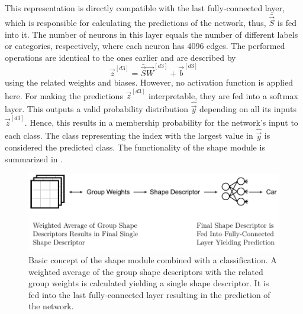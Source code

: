 This representation is directly compatible with the last fully-connected layer, which is responsible for calculating the predictions of the network, thus, $\bar{\vec{S}}$ is fed into it.
The number of neurons in this layer equals the number of different labels or categories, respectively, where each neuron has 4096 edges.
The performed operations are identical to the ones earlier and are described by
\begin{equation}
	\vec{z}^{[d3]} = \bar{\vec{S}} \vec{W}^{[d3]} + \vec{b}^{[d3]}
\end{equation}
using the related weights and biases.
However, no activation function is applied here.
For making the predictions $\vec{z}^{[d3]}$ interpretable, they are fed into a softmax layer.
This outputs a valid probability distribution $\hat{\vec{y}}$ depending on all its inputs $\vec{z}^{[d3]}$.
Hence, this results in a membership probability for the network's input to each class.
The class representing the index with the largest value in $\hat{\vec{y}}$ is considered the predicted class. The functionality of the shape module is summarized in .
\begin{figure}
	\centering
	\includegraphics[]{images/shape_module_final_shape.pdf}
	\caption[Basic concept of the shape module]{Basic concept of the shape module combined with a classification. A weighted average of the group shape descriptors with the related group weights is calculated yielding a single shape descriptor. It is fed into the last fully-connected layer resulting in the prediction of the network.}
	\label{fig:shape-module-final-shape}
\end{figure}